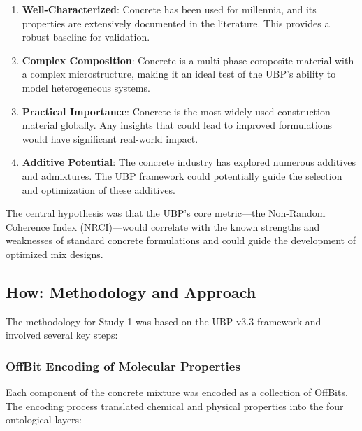 \documentclass[11pt,a4paper]{article}
\begin{document}
\begin{enumerate}
    \item \textbf{Well-Characterized}: Concrete has been used for millennia, and its properties are extensively documented in the literature. This provides a robust baseline for validation.
    
    \item \textbf{Complex Composition}: Concrete is a multi-phase composite material with a complex microstructure, making it an ideal test of the UBP's ability to model heterogeneous systems.
    
    \item \textbf{Practical Importance}: Concrete is the most widely used construction material globally. Any insights that could lead to improved formulations would have significant real-world impact.
    
    \item \textbf{Additive Potential}: The concrete industry has explored numerous additives and admixtures. The UBP framework could potentially guide the selection and optimization of these additives.
\end{enumerate}

The central hypothesis was that the UBP's core metric—the Non-Random Coherence Index (NRCI)—would correlate with the known strengths and weaknesses of standard concrete formulations and could guide the development of optimized mix designs.

\subsection{How: Methodology and Approach}

The methodology for Study 1 was based on the UBP v3.3 framework and involved several key steps:

\subsubsection{OffBit Encoding of Molecular Properties}

Each component of the concrete mixture was encoded as a collection of OffBits. The encoding process translated chemical and physical properties into the four ontological layers:
\end{document}
